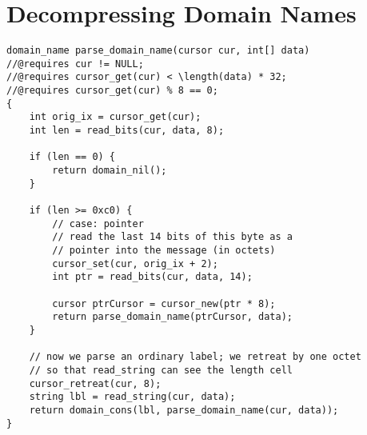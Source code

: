 \documentclass{article}
\newcommand\Kwd[1]{{\sffamily\bfseries{#1}}}
\begin{document}






\clearpage
\appendix
\section{Decompressing Domain Names}\label{appendix:decompression}

\begin{lstlisting}
domain_name parse_domain_name(cursor cur, int[] data)
//@requires cur != NULL;
//@requires cursor_get(cur) < \length(data) * 32;
//@requires cursor_get(cur) % 8 == 0;
{
    int orig_ix = cursor_get(cur);
    int len = read_bits(cur, data, 8);

    if (len == 0) {
        return domain_nil();
    }

    if (len >= 0xc0) {
        // case: pointer
        // read the last 14 bits of this byte as a
        // pointer into the message (in octets)
        cursor_set(cur, orig_ix + 2);
        int ptr = read_bits(cur, data, 14);

        cursor ptrCursor = cursor_new(ptr * 8);
        return parse_domain_name(ptrCursor, data);
    }

    // now we parse an ordinary label; we retreat by one octet
    // so that read_string can see the length cell
    cursor_retreat(cur, 8);
    string lbl = read_string(cur, data);
    return domain_cons(lbl, parse_domain_name(cur, data));
}
\end{lstlisting}
\end{document}
